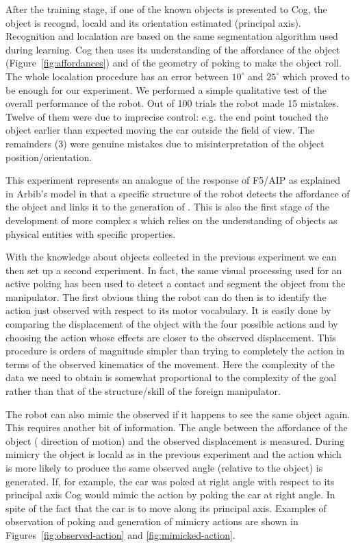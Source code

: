 After the training stage, if one of the known objects is presented to Cog, the 
object is recogn\ize{}d, local\ize{}d and its orientation estimated (principal 
axis). Recognition and local\iz{}ation are based on the same \ahhcolor{} 
segmentation algorithm used during learning. Cog then uses its 
understanding of the affordance of the object (Figure~\ref{fig:affordances}) 
and of the geometry of poking to make the object roll. The whole local\iz{}ation 
procedure has an error between $10^{\circ}$ and $25^{\circ}$ which proved 
to be enough for our experiment. We performed a simple qualitative test of 
the overall performance of the robot. Out of 100 trials the robot made 15 
mistakes. Twelve of them were due to imprecise control: e.g. the end point 
touched the object earlier than expected moving the car outside the field of 
view. The remainders (3) were genuine mistakes due to misinterpretation of 
the object position/orientation.

This experiment represents an analogue of the response of F5/AIP as 
explained in Arbib's model \cite{fagg-arbib-1998} in that a specific 
structure of the robot detects the affordance of the object and links 
it to the generation of \ahhbehavior{}. This is also the first stage of 
the development of more complex \ahhbehavior{}s which relies on the understanding 
of objects as physical entities with specific properties.

With the knowledge about objects collected in the previous experiment
we can then set up a second experiment. In fact, the same visual processing 
used for \ahhanalyzing{} an active poking has been used to detect a contact and 
segment the object from the manipulator. 
The first obvious thing the robot can do then is to identify the action 
just observed with respect to its motor vocabulary. It is easily done by 
comparing the displacement of the object with the four possible actions and 
by choosing the action whose effects are closer to the observed displacement. 
This procedure is orders of magnitude simpler than trying to completely 
\ahhcharacterize{} the action in terms of the observed kinematics of the movement. 
Here the complexity of the data we need to obtain is somewhat proportional 
to the complexity of the goal rather than that of the structure/skill of 
the foreign manipulator.

The robot can also mimic the observed \ahhbehavior{} if it happens to see the 
same object again. This requires another bit of information. The angle 
between the affordance of the object (\ahhpreferred{} direction of motion) and the 
observed displacement is measured. During mimicry the object is local\ize{}d as 
in the previous experiment and the action which is more likely to 
produce the same observed angle (relative to the object) is generated. 
If, for example, the car was poked at right angle with respect to its principal 
axis Cog would mimic the action by poking the car at right angle. In spite 
of the fact that the car \ahhpreferred{} \ahhbehavior{} is to move along its principal 
axis. Examples of observation of poking and generation of mimicry actions are 
shown in Figures~\ref{fig:observed-action} and \ref{fig:mimicked-action}.

